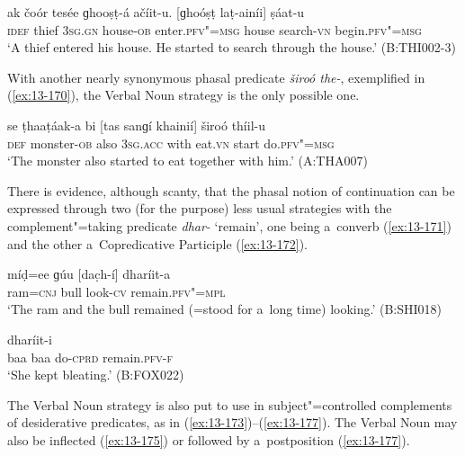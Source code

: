 \begin{exe}
\ex
\label{ex:13-169}
\gll ak čoór tesée ɡhooṣṭ-á ačíit-u. [ɡhoóṣṭ  laṭ-ainíi] ṣáat-u \\
\textsc{idef} thief \textsc{3sg.gn} house-\textsc{ob} enter.\textsc{pfv"=msg} house search-\textsc{vn} begin.\textsc{pfv"=msg} \\
\glt `A thief entered his house. He started to search through the house.' (B:THI002-3) 
\end{exe}

With another nearly synonymous phasal predicate \textit{široó the-}, exemplified in (\ref{ex:13-170}), the Verbal Noun strategy is the only possible one.

\begin{exe}
\ex
\label{ex:13-170}
\gll se ṭhaaṭáak-a bi [tas sanɡí khainií]  široó thíil-u \\
\textsc{def} monster-\textsc{ob} also \textsc{3sg.acc} with eat.\textsc{vn} start do.\textsc{pfv"=msg} \\
\glt `The monster also started to eat together with him.' (A:THA007) 
\end{exe}

There is evidence, although scanty, that the phasal notion of continuation can be expressed through two (for the purpose) less usual strategies with the complement"=taking predicate \textit{dhar-} `remain', one being a~converb (\ref{ex:13-171}) and the other a~Copredicative Participle (\ref{ex:13-172}).

\begin{exe}
\ex
\label{ex:13-171}
\gll míḍ=ee ɡúu [dac̣h-í] dharíit-a \\
ram=\textsc{cnj} bull look-\textsc{cv} remain.\textsc{pfv"=mpl} \\
\glt `The ram and the bull remained (=stood for a~long time) looking.' (B:SHI018)

\ex
\label{ex:13-172}
 dharíit-i  \\
baa baa do-\textsc{cprd} remain.\textsc{pfv-f} \\
\glt `She kept bleating.' (B:FOX022) 
\end{exe}

 The Verbal Noun strategy is also put to use in
subject"=controlled complements of desiderative predicates, as in
(\ref{ex:13-173})--(\ref{ex:13-177}). The Verbal Noun may also be inflected
(\ref{ex:13-175}) or followed by
a~postposition (\ref{ex:13-177}).

